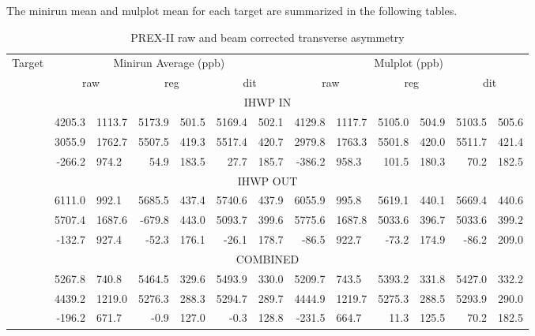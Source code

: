 The minirun mean and mulplot mean for each target are summarized in the following
tables.
\begin{table}[!h]
    \scriptsize
    \begin{tabular}{c | r@{ $\pm$ }l r@{ $\pm$ }l r@{ $\pm$ }l | r@{ $\pm$ }l r@{ $\pm$ }l r@{ $\pm$ }l}
	\hline
	\multirow{2}{*}{Target}	& \multicolumn{6}{c|}{Minirun Average (ppb)} & \multicolumn{6}{c}{Mulplot (ppb)}	\\
	\cline{2-13}
	    & \multicolumn{2}{c}{raw}   & \multicolumn{2}{c}{reg}	& \multicolumn{2}{c|}{dit}   & \multicolumn{2}{c}{raw}	& \multicolumn{2}{c}{reg}   & \multicolumn{2}{c}{dit}	\\
	\hline
	\multicolumn{13}{c}{IHWP IN}   \\
	\hline
	\C	& 4205.3	& 1113.7    & 5173.9	& 501.5	    & 5169.4	& 502.1	    & 4129.8  & 1117.7    & 5105.0  & 504.9     & 5103.5  & 505.6   \\ 
	\ca	& 3055.9	& 1762.7    & 5507.5	& 419.3     & 5517.4	& 420.7	    & 2979.8  & 1763.3    & 5501.8  & 420.0     & 5511.7  & 421.4   \\   
	\Pb	& -266.2	& 974.2     & 54.9  	& 183.5     & 27.7  	& 185.7	    & -386.2  & 958.3     & 101.5   & 180.3     & 70.2    & 182.5   \\   
	\hline
	\multicolumn{13}{c}{IHWP OUT}   \\
	\hline
	\C	& 6111.0	& 992.1	    & 5685.5	& 437.4	    & 5740.6	& 437.9	    & 6055.9  & 995.8     & 5619.1  & 440.1     & 5669.4  & 440.6   \\ 
	\ca	& 5707.4	& 1687.6    & -679.8	& 443.0     & 5093.7	& 399.6	    & 5775.6  & 1687.8    & 5033.6  & 396.7     & 5033.6  & 399.2   \\   
	\Pb	& -132.7	& 927.4     & -52.3 	& 176.1     & -26.1 	& 178.7	    & -86.5   & 922.7     & -73.2   & 174.9     & -86.2   & 209.0   \\   
	\hline
	\multicolumn{13}{c}{COMBINED}   \\
	\hline
	\C	& 5267.8	& 740.8	    & 5464.5	& 329.6	    & 5493.9	& 330.0	    & 5209.7  & 743.5     & 5393.2  & 331.8     & 5427.0  & 332.2   \\ 
	\ca	& 4439.2	& 1219.0    & 5276.3	& 288.3     & 5294.7	& 289.7	    & 4444.9  & 1219.7    & 5275.3  & 288.5     & 5293.9  & 290.0   \\   
	\Pb	& -196.2	& 671.7     & -0.9  	& 127.0     & -0.3  	& 128.8	    & -231.5  & 664.7     & 11.3    & 125.5     & 70.2    & 182.5   \\   
	\hline
    \end{tabular}
    \caption{PREX-II raw and beam corrected transverse asymmetry}
\end{table}

